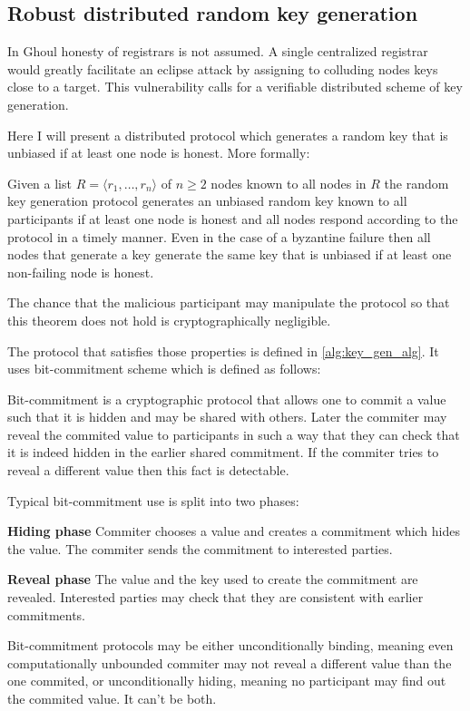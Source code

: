 \subsection{Robust distributed random key generation}

In Ghoul honesty of registrars is not assumed. A single centralized
registrar would greatly facilitate an eclipse attack by assigning to colluding
nodes keys close to a target. This vulnerability  calls for a verifiable
distributed scheme of key generation.

Here I will present a distributed protocol which generates a random key that is
unbiased if at least one node is honest. More formally:

\begin{theorem*}
  Given a list $R = \langle r_1, \ldots, r_n \rangle$ of $n \geq 2$ nodes known
  to all nodes in $R$ the random key generation protocol generates an unbiased
  random key known to all participants if at least one node is honest and all
  nodes respond according to the protocol in a timely manner. Even in the case
  of a byzantine failure then all nodes that generate a key generate the same
  key that is unbiased if at least one non-failing node is honest.

  The chance that the malicious participant may manipulate the protocol so that
  this theorem does not hold is cryptographically negligible.
\end{theorem*}

The protocol that satisfies those properties is defined in
\ref{alg:key_gen_alg}.  It uses bit-commitment scheme which is defined as
follows:

\begin{defin*}
  Bit-commitment is a cryptographic protocol that allows one to commit a value
  such that it is hidden and may be shared with others. Later the commiter may
  reveal the commited value to participants in such a way that they can check
  that it is indeed hidden in the earlier shared commitment. If the commiter
  tries to reveal a different value then this fact is detectable.

  Typical bit-commitment use is split into two phases:
  \begin{description}
    \item{\textbf{Hiding phase}} Commiter chooses a value and creates a
      commitment which hides the value. The commiter sends the commitment to
      interested parties.
    \item{\textbf{Reveal phase}} The value and the key used to create the
      commitment are revealed. Interested parties may check that they are
      consistent with earlier commitments.
  \end{description}

  Bit-commitment protocols may be either unconditionally binding, meaning even
  computationally unbounded commiter may not reveal a different value than the
  one commited, or unconditionally hiding, meaning no participant may find out
  the commited value. It can't be both.
\end{defin*}

